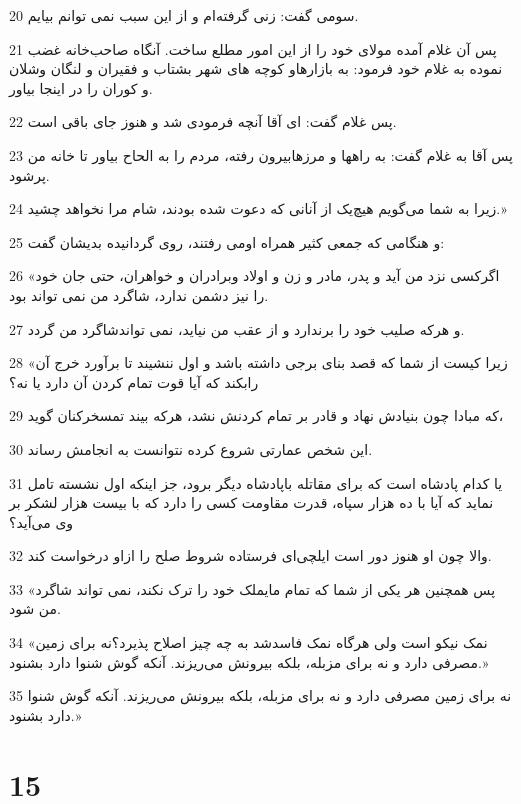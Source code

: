 \par 20 سومی گفت: زنی گرفته‌ام و از این سبب نمی توانم بیایم.
\par 21 پس آن غلام آمده مولای خود را از این امور مطلع ساخت. آنگاه صاحب‌خانه غضب نموده به غلام خود فرمود: به بازارهاو کوچه های شهر بشتاب و فقیران و لنگان وشلان و کوران را در اینجا بیاور.
\par 22 پس غلام گفت: ای آقا آنچه فرمودی شد و هنوز جای باقی است.
\par 23 پس آقا به غلام گفت: به راهها و مرزهابیرون رفته، مردم را به الحاح بیاور تا خانه من پرشود.
\par 24 زیرا به شما می‌گویم هیچ‌یک از آنانی که دعوت شده بودند، شام مرا نخواهد چشید.»
\par 25 و هنگامی که جمعی کثیر همراه اومی رفتند، روی گردانیده بدیشان گفت:
\par 26 «اگرکسی نزد من آید و پدر، مادر و زن و اولاد وبرادران و خواهران، حتی جان خود را نیز دشمن ندارد، شاگرد من نمی تواند بود.
\par 27 و هر‌که صلیب خود را برندارد و از عقب من نیاید، نمی تواندشاگرد من گردد.
\par 28 «زیرا کیست از شما که قصد بنای برجی داشته باشد و اول ننشیند تا برآورد خرج آن رابکند که آیا قوت تمام کردن آن دارد یا نه؟
\par 29 که مبادا چون بنیادش نهاد و قادر بر تمام کردنش نشد، هر‌که بیند تمسخرکنان گوید،
\par 30 این شخص عمارتی شروع کرده نتوانست به انجامش رساند.
\par 31 یا کدام پادشاه است که برای مقاتله باپادشاه دیگر برود، جز اینکه اول نشسته تامل نماید که آیا با ده هزار سپاه، قدرت مقاومت کسی را دارد که با بیست هزار لشکر بر وی می‌آید؟
\par 32 والا چون او هنوز دور است ایلچی‌ای فرستاده شروط صلح را ازاو درخواست کند.
\par 33 «پس همچنین هر یکی از شما که تمام مایملک خود را ترک نکند، نمی تواند شاگرد من شود.
\par 34 «نمک نیکو است ولی هرگاه نمک فاسدشد به چه چیز اصلاح پذیرد؟نه برای زمین مصرفی دارد و نه برای مزبله، بلکه بیرونش می‌ریزند. آنکه گوش شنوا دارد بشنود.»
\par 35 نه برای زمین مصرفی دارد و نه برای مزبله، بلکه بیرونش می‌ریزند. آنکه گوش شنوا دارد بشنود.»

\chapter{15}

